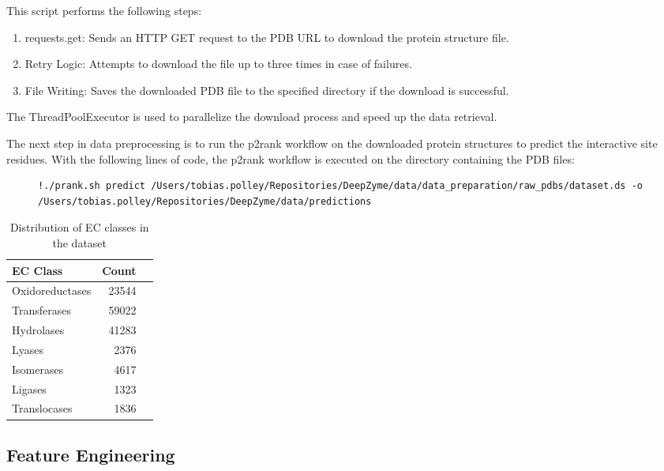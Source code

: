 This script performs the following steps:
\begin{enumerate}
    \item requests.get: Sends an HTTP GET request to the PDB URL to download the protein structure file.
    \item Retry Logic: Attempts to download the file up to three times in case of failures.
    \item File Writing: Saves the downloaded PDB file to the specified directory if the download is successful.
\end{enumerate}

The ThreadPoolExecutor is used to parallelize the download process and speed up the data retrieval.

The next step in data preprocessing is to run the p2rank workflow on the downloaded protein structures to predict the interactive site residues. With the following lines of code, the p2rank workflow is executed on the directory containing the PDB files:

\begin{figure}[bht]
\begin{lstlisting}[caption=Command Line for running p2rank on a given directory, label=lst:p2rank-workflow]
    !./prank.sh predict /Users/tobias.polley/Repositories/DeepZyme/data/data_preparation/raw_pdbs/dataset.ds -o /Users/tobias.polley/Repositories/DeepZyme/data/predictions
\end{lstlisting}
\end{figure}

\begin{table}[hbt]
    \centering
    \begin{tabular}{lrr}
        \toprule
        EC Class & Count \\
        \midrule
        Oxidoreductases & 23544 \\
        Transferases & 59022 \\
        Hydrolases & 41283 \\
        Lyases & 2376 \\
        Isomerases & 4617 \\
        Ligases & 1323 \\
        Translocases & 1836 \\
        \bottomrule
    \end{tabular}
    \caption{Distribution of EC classes in the dataset}
    \label{tab:ec-distribution}
\end{table}

\subsection{Feature Engineering}
\label{sec:Feature Engineering}

